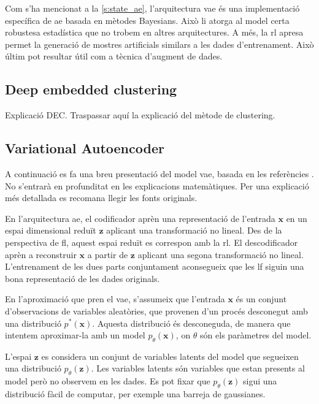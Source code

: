 \documentclass[CAT,BIB]{TFUOC}%
\newcommand{\todo}[1]{
            \begin{tcolorbox}[title=ToDo!, colback=red!5!white, colframe=red!50!black, coltext=red!50!black]
            #1
            \end{tcolorbox}}
\begin{document}
    Com s'ha mencionat a la \cref{s:state_ae},
    l'arquitectura \gls{vae} és una implementació específica de \gls{ae}
    basada en mètodes Bayesians.
    Això li atorga al model certa robustesa estadística
    que no trobem en altres arquitectures.
    A més,
    la \gls{rl} apresa permet la generació de mostres artificials
    similars a les dades d'entrenament.
    Això últim pot resultar útil com a tècnica d'augment de dades.

    \subsection{Deep embedded clustering}
    \label{s:metodes_dec}

\todo{Explicació DEC. Traspassar aquí la explicació del mètode de clustering.}


    \subsection{Variational Autoencoder}
    \label{s:metodes_vae}

        A continuació es fa una breu presentació del model \gls{vae},
        basada en les referències \citep{Kingma2014,Kingma2019}.
        No s'entrarà en profunditat en les explicacions matemàtiques.
        Per una explicació més detallada es recomana llegir les fonts originals.

        En l'arquitectura \gls{ae},
        el codificador aprèn una representació de l'entrada $\mathbf{x}$
        en un espai dimensional reduït $\mathbf{z}$
        aplicant una transformació no lineal.
        Des de la perspectiva de \gls{fl},
        aquest espai reduït es correspon amb la \gls{rl}.
        El descodificador aprèn a reconstruir $\mathbf{x}$ a partir de $\mathbf{z}$
        aplicant una segona transformació no lineal.
        L'entrenament de les dues parts conjuntament
        aconsegueix que les \gls{lf} siguin una bona representació de les dades originals.

        En l'aproximació que pren el \gls{vae},
        s'assumeix que l'entrada $\mathbf{x}$ és un conjunt d'observacions de variables aleatòries,
        que provenen d'un procés desconegut
        amb una distribució $p^*(\mathbf{x})$.
        Aquesta distribució és desconeguda,
        de manera que intentem aproximar-la amb un model $p_\theta(\mathbf{x})$,
        on $\theta$ són els paràmetres del model.

        L'espai $\mathbf{z}$ es considera un conjunt de variables latents del model
        que segueixen una distribució $p_\theta(\mathbf{z})$.
        Les variables latents són variables que estan presents al model però no observem en les dades.
        Es pot fixar que $p_\theta(\mathbf{z})$ sigui una distribució fàcil de computar,
        per exemple una barreja de gaussianes.
\end{document}

